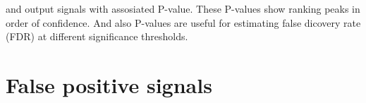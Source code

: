 





and output signals with assosiated P-value.
These P-values show ranking peaks in order of confidence.
And also P-values are useful for estimating false dicovery rate (FDR) at different significance thresholds.


\section{False positive signals}